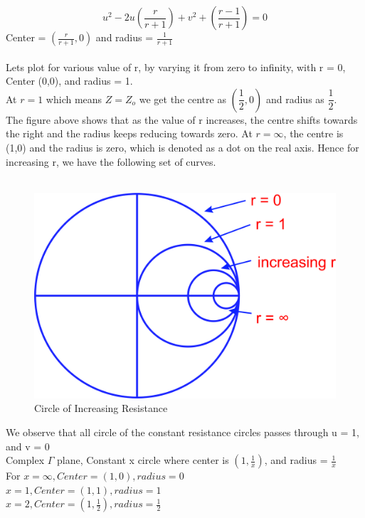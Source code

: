 \begin{equation*}
u^2 - 2u\left(\frac{r}{r + 1}\right) + v^2 +\left(\frac{r - 1}{r + 1}\right) = 0
\end{equation*}
Center = $(\frac{r}{r + 1},0)$ and radius = $\frac{1}{r + 1}$\\\\
Lets plot for various value of r, by varying it from zero to infinity, with r = 0, Center (0,0), and radius = 1.\\
At $r = 1$ which means $Z = Z_o$ we get the centre as $(\dfrac{1}{2}, 0)$ and radius as $\dfrac{1}{2}$.\\
The figure above shows that as the value of r increases, the centre shifts towards the right and the radius keeps reducing towards zero. At $r = \infty$, the centre is (1,0) and the radius is zero, which is denoted as a dot on the real axis. Hence for increasing r, we have the following set of curves.\\\\
\begin{figure}[h]
\centering
\includegraphics[width=0.5\linewidth]{./graphics/rghmgfcx}
\caption{Circle of Increasing Resistance}
\label{fig:rghmgfcx}
\end{figure}
We observe that all circle of the constant resistance circles passes through u = 1, and v = 0\\
Complex $\Gamma$ plane, Constant x circle where center is $(1,\frac{1}{x})$, and radius = $\frac{1}{x}$\\
For $x = \infty,Center = (1,0), radius = 0$\\
$x = 1,Center = (1,1), radius = 1$\\
$x = 2,Center = (1,\frac{1}{2}), radius = \frac{1}{2}$\\
